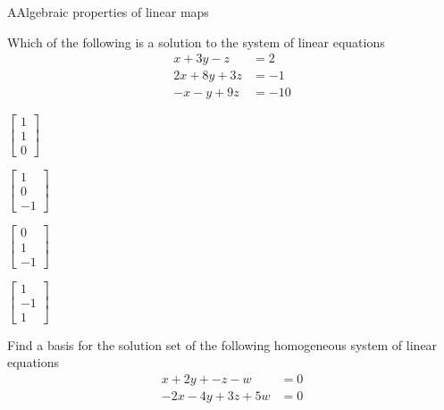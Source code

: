 \documentclass{article}[12pt]
\begin{document}
\begin{module}{A}{Algebraic properties of linear maps}

  \begin{readinessAssuranceTest}
  \item Which of the following is a solution to the system of linear equations
        \begin{align*}
        x+3y-z    &=   2 \\
        2x+8y+3z  &=  -1 \\
        -x-y+9z   &= -10
        \end{align*}

  \begin{multicols}{4}
  \begin{readinessAssuranceTestChoices}
  \item $\begin{bmatrix} 1 \\ 1 \\ 0 \end{bmatrix}$
  \item $\begin{bmatrix} 1 \\ 0 \\ -1 \end{bmatrix}$%
  \item $\begin{bmatrix} 0 \\ 1 \\ -1 \end{bmatrix}$
  \item $\begin{bmatrix} 1 \\ -1 \\ 1 \end{bmatrix}$
  \end{readinessAssuranceTestChoices}
  \end{multicols}


  \item Find a basis for the solution set of the following homogeneous system of
        linear equations
        \begin{align*}
        x+2y+-z-w    &= 0 \\
        -2x-4y+3z+5w &= 0
        \end{align*}


\end{readinessAssuranceTest}
\end{module}
\end{document}
